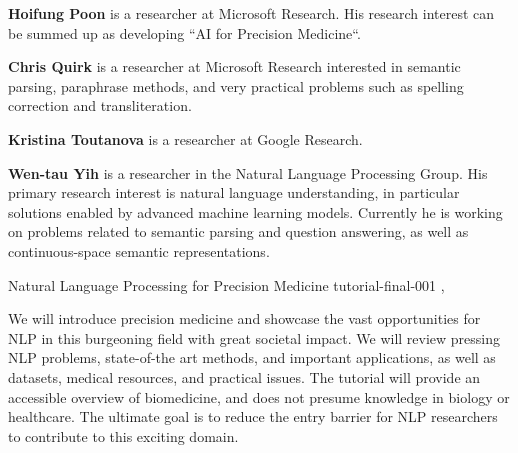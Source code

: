 \begin{bio}
  {\bfseries Hoifung Poon} is a researcher at Microsoft Research. His research
  interest can be summed up as developing “AI for Precision Medicine“.

  {\bfseries Chris Quirk} is a researcher at Microsoft Research interested in
  semantic parsing, paraphrase methods, and very practical problems such as
  spelling correction and transliteration.

  {\bfseries Kristina Toutanova} is a researcher at Google Research.

  {\bfseries Wen-tau Yih} is a researcher in the Natural Language Processing
  Group. His primary research interest is natural language understanding, in
  particular solutions enabled by advanced machine learning models. Currently
  he is working on problems related to semantic parsing and question
  answering, as well as continuous-space semantic representations.

\end{bio}

\begin{tutorial}
  {Natural Language Processing for Precision Medicine}
  {tutorial-final-001}
  {\daydateyear, \tutorialmorningtime}
  {\TutLocA}

We will introduce precision medicine and showcase the vast opportunities for
NLP in this burgeoning field with great societal impact. We will review
pressing NLP problems, state-of-the art methods, and important applications,
as well as datasets, medical resources, and practical issues. The tutorial
will provide an accessible overview of biomedicine, and does not presume
knowledge in biology or healthcare. The ultimate goal is to reduce the entry
barrier for NLP researchers to contribute to this exciting domain.

\end{tutorial}